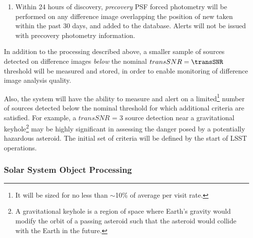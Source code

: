 \documentclass[SE,lsstdraft,toc]{lsstdoc}
\begin{document}
\begin{enumerate}
\item Within 24 hours of discovery, \emph{precovery} PSF forced photometry will be performed on any difference image overlapping the position of new \DIAObjects taken within the past 30 days, and added to the database. Alerts will not be issued with precovery photometry information.
\end{enumerate}

In addition to the processing described above, a smaller sample of sources detected on difference images \emph{below} the nominal $transSNR = \transSNR$  threshold will be measured and stored, in order to enable monitoring of difference image analysis quality.

Also, the system will have the ability to measure and alert on a limited\footnote{It will be sized for no less than $\sim$10\% of average \DIASource per visit rate.} number of sources detected below the nominal threshold for which additional criteria are satisfied. For example, a $transSNR$ = 3 source detection near a gravitational keyhole\footnote{
A gravitational keyhole is a region of space where Earth's gravity would modify the orbit of a passing asteroid
such that the asteroid would collide with the Earth in the future.}
may be highly significant in assessing the danger posed by a potentially hazardous asteroid.
The initial set of criteria will be defined by the start of LSST operations.

\subsubsection{Solar System Object Processing}
\label{sec:ssProcessing}
\end{document}
